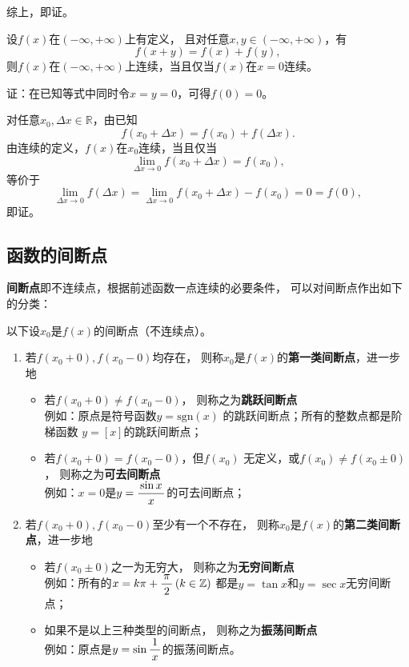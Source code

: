 综上，即证。\fin

\bs
\egz 
设$f(x)$在$(-\infty,+\infty)$上有定义，
且对任意$x,y\in (-\infty,+\infty)$，有
$$f(x+y)=f(x)+f(y),$$
则$f(x)$在$(-\infty,+\infty)$上连续，当且仅当$f(x)$在$x=0$连续。

证：在已知等式中同时令$x=y=0$，可得$f(0)=0$。

对任意$x_0,\Delta x\in\mathbb{R}$，由已知
$$f(x_0+\Delta x)=f(x_0)+f(\Delta x).$$
由连续的定义，$f(x)$在$x_0$连续，当且仅当
$$\lim\limits_{\Delta x\to 0}f(x_0+\Delta x)=f(x_0),$$
等价于
$$\lim\limits_{\Delta x\to 0}f(\Delta x)
=\lim\limits_{\Delta x\to 0}f(x_0+\Delta x)-f(x_0)=0=f(0),$$
即证。\fin


\subsection{函数的间断点}

{\bf 间断点}即不连续点，根据前述函数一点连续的必要条件，
可以对间断点作出如下的分类：

\begin{thx}
	以下设$x_0$是$f(x)$的间断点（不连续点）。
	\begin{enumerate}[(1)]
		\item 若$f(x_0+0),f(x_0-0)$均存在，
		则称$x_0$是$f(x)$的{\bf 第一类间断点}，进一步地
		\begin{itemize}
			\item 若$f(x_0+0)\ne f(x_0-0)$，
			则称之为{\bf 跳跃间断点}\\
			\quad 例如：原点是符号函数$y=\mathrm{sgn}(x)$
			的跳跃间断点；所有的整数点都是阶梯函数
			$y=[x]$的跳跃间断点；
			\item 若$f(x_0+0)=f(x_0-0)$，但$f(x_0)$
			无定义，或$f(x_0)\ne f(x_0\pm0)$，
			则称之为{\bf 可去间断点}\\
			\quad 例如：$x=0$是$y=\displaystyle\frac{\,{\sin x}\,}{\,{x}\,}$的可去间断点；
		\end{itemize}
		\item 若$f(x_0+0),f(x_0-0)$至少有一个不存在，
		则称$x_0$是$f(x)$的{\bf 第二类间断点}，进一步地
		\begin{itemize}
			\item 若$f(x_0\pm0)$之一为无穷大，
			则称之为{\bf 无穷间断点}\\
			\quad 例如：所有的$x=k\pi+\displaystyle\frac{\,{\pi}\,}{\,{2}\,}\,(k\in\mathbb{Z})$
			都是$y=\tan x$和$y=\sec x$无穷间断点；
			\item 如果不是以上三种类型的间断点，
			则称之为{\bf 振荡间断点}\\
			\quad 例如：原点是$y=\sin\displaystyle\frac{\,{1}\,}{\,{x}\,}$的振荡间断点。
		\end{itemize}
	\end{enumerate}
\end{thx}

